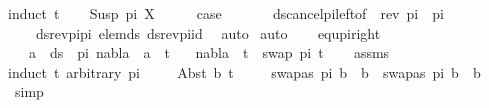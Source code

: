 \begin{isabellebody}
\isatagproof
{}\isamarkupfalse%
{\isacharparenleft}{\kern0pt}induct\ t{\isacharparenright}{\kern0pt}\isanewline
\ \ \isamarkupfalse%
\ {\isacharparenleft}{\kern0pt}Susp\ pi{\isacharprime}{\kern0pt}\ X{\isacharparenright}{\kern0pt}\isanewline
\ \ \isamarkupfalse%
\ \isamarkupfalse%
\ {\isacharquery}{\kern0pt}case\ \isanewline
\ \ \ \ \isamarkupfalse%
\ ds{\isacharunderscore}{\kern0pt}cancel{\isacharunderscore}{\kern0pt}pi{\isacharunderscore}{\kern0pt}left{\isacharbrackleft}{\kern0pt}of\ {\isacharunderscore}{\kern0pt}\ {\isacartoucheopen}rev\ pi\ {\isacharat}{\kern0pt}\ pi{\isacartoucheclose}\ {\isacharunderscore}{\kern0pt}\ {\isacartoucheopen}{\isacharbrackleft}{\kern0pt}{\isacharbrackright}{\kern0pt}{\isacartoucheclose}{\isacharbrackright}{\kern0pt}\isanewline
\ \ \ \ ds{\isacharunderscore}{\kern0pt}rev{\isacharunderscore}{\kern0pt}pi{\isacharunderscore}{\kern0pt}pi\ elem{\isacharunderscore}{\kern0pt}ds\ ds{\isacharunderscore}{\kern0pt}rev{\isacharunderscore}{\kern0pt}pi{\isacharunderscore}{\kern0pt}id\ \isamarkupfalse%
\ auto\isanewline
{}\isamarkupfalse%
\ {\isacharparenleft}{\kern0pt}auto{\isacharparenright}{\kern0pt}%
\endisatagproof
{\isafoldproof}%
%
\isadelimproof
\isanewline
%
\endisadelimproof
\ \ \isanewline
\isanewline
{}\isamarkupfalse%
\ equ{\isacharunderscore}{\kern0pt}pi{\isacharunderscore}{\kern0pt}right{\isacharcolon}{\kern0pt}\ \isanewline
\ \ \ {\isachardoublequoteopen}{\isasymforall}a\ {\isasymin}\ ds\ {\isacharbrackleft}{\kern0pt}{\isacharbrackright}{\kern0pt}\ pi{\isachardot}{\kern0pt}\ nabla\ {\isasymturnstile}\ a\ {\isasymsharp}\ t{\isachardoublequoteclose}\isanewline
\ \ \ {\isachardoublequoteopen}nabla\ {\isasymturnstile}\ t\ {\isasymapprox}\ swap\ pi\ t{\isachardoublequoteclose}\isanewline
%
\isadelimproof
\ \ %
\endisadelimproof
%
\isatagproof
{}\isamarkupfalse%
\ assms\isanewline
{}\isamarkupfalse%
{\isacharparenleft}{\kern0pt}induct\ t\ arbitrary{\isacharcolon}{\kern0pt}\ pi{\isacharparenright}{\kern0pt}\isanewline
\ \ \ \isamarkupfalse%
\ {\isacharparenleft}{\kern0pt}Abst\ b\ t{\isacharprime}{\kern0pt}{\isacharparenright}{\kern0pt}\isanewline
\ \ \ \isamarkupfalse%
\ {\isachardoublequoteopen}swapas\ pi\ b\ {\isacharequal}{\kern0pt}\ b\ {\isasymor}\ swapas\ pi\ b\ {\isasymnoteq}\ b{\isachardoublequoteclose}\ \isamarkupfalse%
\ simp\isanewline
\ \ \isamarkupfalse%

\end{isabellebody}

